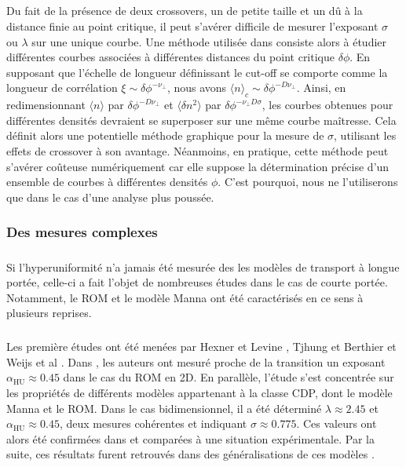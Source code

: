 \subparagraph{}Du fait de la présence de deux crossovers, un de petite taille et un dû à la distance finie au point critique, il peut s'avérer difficile de mesurer l'exposant $\sigma$ ou $\lambda$ sur une unique courbe. Une méthode utilisée dans \cite{hexner_hyperuniformity_2015} consiste alors à étudier différentes courbes associées à différentes distances du point critique $\delta\phi$. En supposant que l'échelle de longueur définissant le cut-off se comporte comme la longueur de corrélation $\xi\sim \delta\phi^{-\nu_\perp}$, nous avons $\langle n \rangle_c \sim \delta\phi^{-D\nu_\perp}$. Ainsi, en redimensionnant $\langle n \rangle$ par $ \delta\phi^{-D\nu_\perp}$ et $\langle \delta n^2 \rangle$ par $\delta\phi^{-\nu_\perp D \sigma}$, les courbes obtenues pour différentes densités devraient se superposer sur une même courbe maîtresse. Cela définit alors une potentielle méthode graphique pour la mesure de $\sigma$, utilisant les effets de crossover à son avantage. Néanmoins, en pratique, cette méthode peut s'avérer coûteuse numériquement car elle suppose la détermination précise d'un ensemble de courbes à différentes densités $\phi$. C'est pourquoi, nous ne l'utiliserons que dans le cas d'une analyse plus poussée.

\subsubsection{Des mesures complexes}

\subparagraph{}Si l'hyperuniformité n'a jamais été mesurée des les modèles de transport à longue portée, celle-ci a fait l'objet de nombreuses études dans le cas de courte portée. Notamment, le ROM et le modèle Manna ont été caractérisés en ce sens à plusieurs reprises.

\subparagraph{}Les première études ont été menées par Hexner et Levine \cite{hexner_hyperuniformity_2015}, Tjhung et Berthier \cite{tjhung_hyperuniform_2015} et Weijs et al \cite{weijs_emergent_2015}. Dans \cite{tjhung_hyperuniform_2015}, les auteurs ont mesuré proche de la transition un exposant $\alpha_\text{HU} \approx 0.45$ dans le cas du ROM en 2D. En parallèle, l'étude \cite{hexner_hyperuniformity_2015} s'est concentrée sur les propriétés de différents modèles appartenant à la classe CDP, dont le modèle Manna et le ROM. Dans le cas bidimensionnel, il a été déterminé $\lambda\approx 2.45$ et $\alpha_\text{HU}\approx 0.45$, deux mesures cohérentes et indiquant $\sigma \approx 0.775$. Ces valeurs ont alors été confirmées dans \cite{weijs_emergent_2015} et comparées à une situation expérimentale. Par la suite, ces résultats furent retrouvés dans des généralisations de ces modèles \cite{hexner_noise_2017, ma_hyperuniformity_2019}.

